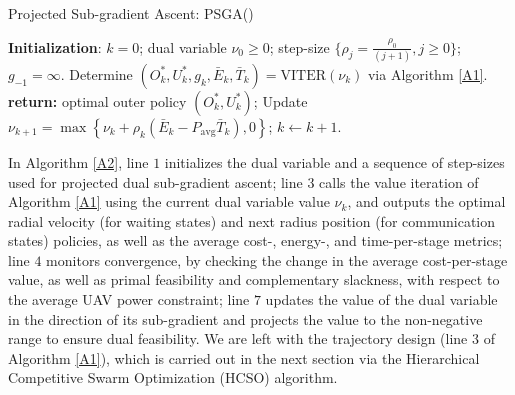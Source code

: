 \documentclass[12pt, draftcls, onecolumn]{IEEEtran}
\theoremstyle{plain}
\theoremstyle{definition}
\theoremstyle{remark}
\begin{document}
\begin{algorithm}[t]
\caption{Projected Sub-gradient Ascent: PSGA()}\label{A2}
    \begin{algorithmic}[1]
    \scriptsize
    \State \textbf{Initialization}: $k{=}0$; dual variable $\nu_{0}{\geq}0$; step-size $\{\rho_{j}{=}\frac{\rho_{0}}{(j{+}1)},j{\geq}0\}$; $g_{-1}{=}\infty$.
    \vspace{0.1cm}
        \vspace{0.1cm}
    	\State Determine $(O_{k}^{*},U_{k}^{*},g_{k},\bar{E}_{k},\bar{T}_{k})=\mathrm{VITER}\left(\nu_{k}\right)$ via Algorithm \ref{A1}.
    	\vspace{0.1cm}
    	    \vspace{0.1cm}
    	    \State \textbf{return:} optimal outer policy $(O_{k}^{*},U_{k}^{*})$;
    	    \vspace{0.1cm}
    	\Else
    	    \vspace{0.1cm}
    		\State Update $\nu_{k{+}1}{=}\max\left\{\nu_{k}{+}\rho_{k}\left( \bar{E}_{k}{-}P_{\mathrm{avg}}\bar{T}_{k}\right),0\right\}$; $k{\gets}k{+}1$.
    		\vspace{0.1cm}
    	\EndIf
    	\vspace{0.1cm}
    \EndFor
    \end{algorithmic}
\end{algorithm}

In Algorithm \ref{A2}, line $1$ initializes the dual variable and a sequence of step-sizes used for projected dual sub-gradient ascent; line $3$ calls the value iteration of Algorithm \ref{A1} using the current dual variable value $\nu_{k}$, and outputs the optimal radial velocity (for waiting states) and next radius position (for communication states) policies, as well as the average cost-, energy-, and time-per-stage metrics; line $4$ monitors convergence, by checking the change in the average cost-per-stage value, as well as primal feasibility and complementary slackness, with respect to the average UAV power constraint; line $7$ updates the value of the dual variable in the direction of its sub-gradient and projects the value to the non-negative range to ensure dual feasibility. We are left with the trajectory design (line $3$ of Algorithm \ref{A1}), which is carried out in the next section via the Hierarchical Competitive Swarm Optimization (HCSO) algorithm.
\vspace{-4mm}
\end{document}
